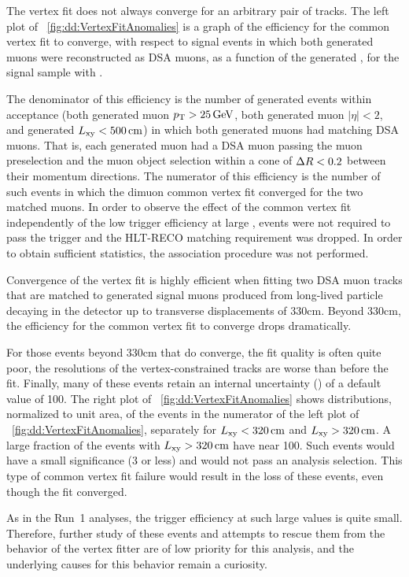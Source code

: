 The vertex fit does not always converge for an arbitrary pair of tracks.
The left plot of \Fig~\ref{fig:dd:VertexFitAnomalies} is a graph of the efficiency for the common vertex fit to converge, with respect to signal events in which both generated muons were reconstructed as DSA muons, as a function of the generated \Lxy, for the \twoMu signal sample with .

The denominator of this efficiency is the number of generated events within acceptance (both generated muon $p_{\mathrm{T}} > 25\,\text{Ge\hspace{-.08em}V}$, both generated muon $|\eta| < 2$, and generated \mbox{$L_{\mathrm{xy}} < 500\,\text{cm}$}) in which both generated muons had matching DSA muons.
That is, each generated muon had a DSA muon passing the muon preselection and the muon object selection within a cone of $\Delta R < 0.2$ between their momentum directions.
The numerator of this efficiency is the number of such events in which the dimuon common vertex fit converged for the two matched muons.
In order to observe the effect of the common vertex fit independently of the low trigger efficiency at large \Lxy, events were not required to pass the trigger and the HLT-RECO matching requirement was dropped.
In order to obtain sufficient statistics, the \DSAToPAT association procedure was not performed.

Convergence of the vertex fit is highly efficient when fitting two DSA muon tracks that are matched to generated signal muons produced from long-lived particle decaying in the detector up to transverse displacements of 330\unit{cm}.
Beyond 330\unit{cm}, the efficiency for the common vertex fit to converge drops dramatically.

For those events beyond 330\unit{cm} that do converge, the fit quality is often quite poor, \eg the \pT resolutions of the vertex-constrained tracks are worse than before the fit.
Finally, many of these events retain an internal \Lxy uncertainty (\LxyErr) of a default value of 100\cm.
The right plot of \Fig~\ref{fig:dd:VertexFitAnomalies} shows distributions, normalized to unit area, of the events in the numerator of the left plot of \Fig~\ref{fig:dd:VertexFitAnomalies}, separately for $L_{\mathrm{xy}} < 320\,\text{cm}$ and $L_{\mathrm{xy}} > 320\,\text{cm}$.
A large fraction of the events with $L_{\mathrm{xy}} > 320\,\text{cm}$ have \LxyErr near 100\cm.
Such events would have a small \Lxy significance (3 or less) and would not pass an analysis selection.
This type of common vertex fit failure would result in the loss of these events, even though the fit converged.

As in the Run~1 analyses, the trigger efficiency at such large \Lxy values is quite small.
Therefore, further study of these events and attempts to rescue them from the behavior of the vertex fitter are of low priority for this analysis, and the underlying causes for this behavior remain a curiosity.

